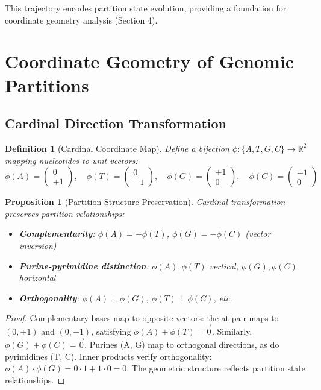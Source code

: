 \documentclass[11pt,a4paper]{article}
\newtheorem{definition}[theorem]{Definition}
\newtheorem{proposition}[theorem]{Proposition}
\theoremstyle{remark}
\begin{document}
This trajectory encodes partition state evolution, providing a foundation for coordinate geometry analysis (Section 4).

\section{Coordinate Geometry of Genomic Partitions}

\subsection{Cardinal Direction Transformation}

\begin{definition}[Cardinal Coordinate Map]
\label{def:cardinal_map}
Define a bijection $\phi: \{A, T, G, C\} \to \mathbb{R}^2$ mapping nucleotides to unit vectors:
\begin{equation}
\phi(A) = \begin{pmatrix} 0 \\ +1 \end{pmatrix}, \quad
\phi(T) = \begin{pmatrix} 0 \\ -1 \end{pmatrix}, \quad
\phi(G) = \begin{pmatrix} +1 \\ 0 \end{pmatrix}, \quad
\phi(C) = \begin{pmatrix} -1 \\ 0 \end{pmatrix}
\end{equation}
\end{definition}

\begin{proposition}[Partition Structure Preservation]
\label{prop:structure_preservation}
Cardinal transformation preserves partition relationships:
\begin{itemize}
\item \textbf{Complementarity}: $\phi(A) = -\phi(T)$, $\phi(G) = -\phi(C)$ (vector inversion)
\item \textbf{Purine-pyrimidine distinction}: $\phi(A), \phi(T)$ vertical, $\phi(G), \phi(C)$ horizontal
\item \textbf{Orthogonality}: $\phi(A) \perp \phi(G)$, $\phi(T) \perp \phi(C)$, etc.
\end{itemize}
\end{proposition}

\begin{proof}
Complementary bases map to opposite vectors: the at pair maps to $(0,+1)$ and $(0,-1)$, satisfying $\phi(A) + \phi(T) = \vec{0}$. Similarly, $\phi(G) + \phi(C) = \vec{0}$. Purines (A, G) map to orthogonal directions, as do pyrimidines (T, C). Inner products verify orthogonality: $\phi(A) \cdot \phi(G) = 0 \cdot 1 + 1 \cdot 0 = 0$. The geometric structure reflects partition state relationships.
\end{proof}
\end{document}
